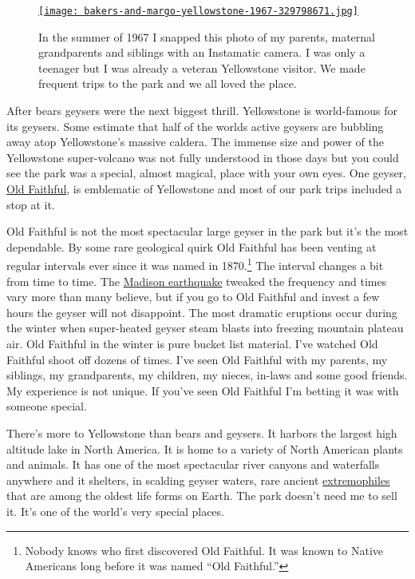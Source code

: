 \captionsetup[figure]{labelformat=empty}

\begin{SCfigure}
\centering
\href{http://conceptcontrol.smugmug.com/People/The-Way-We-Were/i-xCDHX8z/A}{\texttt{[image: bakers-and-margo-yellowstone-1967-329798671.jpg]}}
\caption{In the summer of 1967 I snapped this photo of my parents, maternal
grandparents and siblings with an Instamatic camera. I was only a
teenager but I was already a veteran Yellowstone visitor. We made
frequent trips to the park and we all loved the place.}
\label{fig:4186X1}
\end{SCfigure}

After bears geysers were the next biggest thrill. Yellowstone is
world-famous for its geysers. Some estimate that half of the worlds
active geysers are bubbling away atop Yellowstone's massive caldera. The
immense size and power of the Yellowstone super-volcano was not fully
understood in those days but you could see the park was a special,
almost magical, place with your own eyes. One geyser,
\href{http://www.nps.gov/yell/planyourvisit/noldfaith.htm}{Old
Faithful}, is emblematic of Yellowstone and most of our park trips
included a stop at it.

Old Faithful is not the most spectacular large geyser in the park but
it's the most dependable. By some rare geological quirk Old Faithful has
been venting at regular intervals ever since it was named in
1870.\footnote{
Nobody knows who first discovered Old Faithful. It was known to Native
Americans long before it was named ``Old Faithful.''
} The interval changes a bit from
time to time. The
\href{http://en.wikipedia.org/wiki/1959\_Yellowstone\_earthquake}{Madison
earthquake} tweaked the frequency and times vary more than many believe,
but if you go to Old Faithful and invest a few hours the geyser will not
disappoint. The most dramatic eruptions occur during the winter when
super-heated geyser steam blasts into freezing mountain plateau air. Old
Faithful in the winter is pure bucket list material. I've watched Old
Faithful shoot off dozens of times. I've seen Old Faithful with my
parents, my siblings, my grandparents, my children, my nieces, in-laws
and some good friends. My experience is not unique. If you've seen Old
Faithful I'm betting it was with someone special.

There's more to Yellowstone than bears and geysers. It harbors the
largest high altitude lake in North America. It is home to a variety of
North American plants and animals. It has one of the most spectacular
river canyons and waterfalls anywhere and it shelters, in scalding
geyser waters, rare ancient
\href{http://en.wikipedia.org/wiki/Extremophile}{extremophiles} that are
among the oldest life forms on Earth. The park doesn't need me to sell
it. It's one of the world's very special places.


